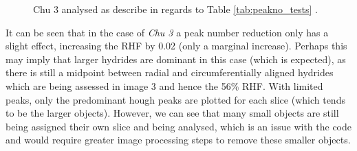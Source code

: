 \documentclass{article}
\begin{document}
    \begin{figure}[H]
        \centering
        \hfill
        \caption{Chu 3 analysed as describe in regards to Table \ref{tab:peakno_tests} .}
    \label{fig:chu3_PN_comparison}
    \end{figure}
    
    \noindent It can be seen that in the case of \textit{Chu 3} a peak number reduction only has a slight effect, increasing the RHF by 0.02 (only a marginal increase). Perhaps this may imply that larger hydrides are dominant in this case (which is expected), as there is still a midpoint between radial and circumferentially aligned hydrides which are being assessed in image 3 and hence the 56\% RHF. With limited peaks, only the predominant hough peaks are plotted for each slice (which tends to be the larger objects). However, we can see that many small objects are still being assigned their own slice and being analysed, which is an issue with the code and would require greater image processing steps to remove these smaller objects.
    
\end{document}
